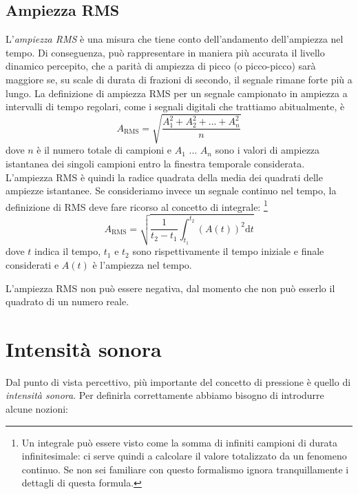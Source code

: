 \documentclass[11pt]{report}
\begin{document}
\subsection{Ampiezza RMS}

L'\emph{ampiezza RMS} è una misura che tiene conto dell'andamento dell'ampiezza nel tempo. Di conseguenza, può rappresentare in maniera più accurata il livello dinamico percepito, che a parità di ampiezza di picco (o picco-picco) sarà maggiore se, su scale di durata di frazioni di secondo, il segnale rimane forte più a lungo. La definizione di ampiezza RMS per un segnale campionato in ampiezza a intervalli di tempo regolari, come i segnali digitali che trattiamo abitualmente, è
\begin{equation}\label{eq:rms}
A_{\text{RMS}} = \sqrt{\frac{A_1^2+A_2^2+\ldots+A_n^2}{n}}
\end{equation}
dove $n$ è il numero totale di campioni e $A_1$ ... $A_n$ sono i valori di ampiezza istantanea dei singoli campioni entro la finestra temporale considerata. L'ampiezza RMS è quindi la radice quadrata della media dei quadrati delle ampiezze istantanee. Se consideriamo invece un segnale continuo nel tempo, la definizione di RMS deve fare ricorso al concetto di integrale:%
\footnote{Un integrale può essere visto come la somma di infiniti campioni di durata infinitesimale: ci serve quindi a calcolare il valore totalizzato da un fenomeno continuo. Se non sei familiare con questo formalismo ignora tranquillamente i dettagli di questa formula.}
\begin{equation*}
A_{\textrm{RMS}} = \sqrt{\frac{1}{t_2-t_1}\int_{t_1}^{t_2}(A(t))^2\textrm{d}t}
\end{equation*}
dove $t$ indica il tempo, $t_1$ e $t_2$ sono rispettivamente il tempo iniziale e finale considerati e $A(t)$ è l'ampiezza nel tempo.

L'ampiezza RMS non può essere negativa, dal momento che non può esserlo il quadrato di un numero reale.


\section{Intensità sonora}

Dal punto di vista percettivo, più importante del concetto di pressione è quello di \emph{intensità sonora}. Per definirla correttamente abbiamo bisogno di introdurre alcune nozioni:
\end{document}
